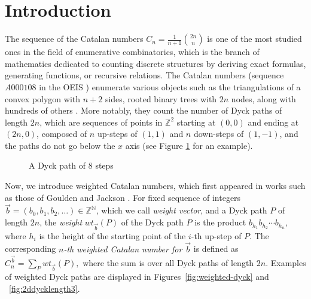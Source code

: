 \documentclass[12pt,notitlepage]{amsart}
\numberwithin{equation}{section}
\theoremstyle{thmstyleone}%
\theoremstyle{thmstyletwo}%
\theoremstyle{thmstylethree}%
\numberwithin{theorem}{section}
\numberwithin{equation}{section}
\begin{document}
\section{Introduction}
\label{section:intro}
The sequence of the Catalan numbers $\displaystyle C_n = \frac{1}{n+1} \binom{2n}{n}$ is one of the most studied ones in the field of enumerative combinatorics, which is the branch of mathematics dedicated to counting discrete structures by deriving exact formulas, generating functions, or recursive relations. The Catalan numbers (sequence $A000108$ in the OEIS \cite{oeis}) enumerate various objects such as the triangulations of a convex polygon with $n+2$ sides, rooted binary trees with $2n$ nodes, along with hundreds of others \cite{StanleyCatalan}. More notably, they count the number of Dyck paths of length $2n$, which are sequences of points in $\mathbb{Z}^2$ starting at $(0,0)$ and ending at $(2n,0)$, composed of $n$ up-steps of $(1,1)$ and $n$ down-steps of $(1, -1)$, and the paths do not go below the $x$ axis (see Figure \ref{fig:dyckpath} for an example).
\begin{figure}[h]
\centering
{}
\vspace{-0.5 em}
\caption{A Dyck path of $8$ steps}
    \label{fig:dyckpath}
\end{figure}

Now, we introduce weighted Catalan numbers, which first appeared in works such as those of Goulden and Jackson \cite{Goulden}. For fixed sequence of integers $\vec{b} = (b_0,b_1,b_2,\ldots) \in \mathbb{Z}^{\mathbb{N}}$, which we call \emph{weight vector}, and a Dyck path $P$ of length $2n$, the \emph{weight} $wt_{\vec{b}}(P)$ of the Dyck path $P$ is the product $b_{h_1} b_{h_2}\cdots b_{h_n}$, where $h_i$ is the height of the starting point of the $i$-th up-step of $P$. The corresponding \emph{$n$-th weighted Catalan number for $\vec{b}$} is defined as $\displaystyle C_n^{\vec{b}} = \sum_P wt_{\vec{b}}(P),$  where the sum is over all Dyck paths of length $2n$. Examples of weighted Dyck paths are displayed in Figures~\ref{fig:weighted-dyck} and ~\ref{fig:2ddycklength3}.
\vspace{-0.5em}
\end{document}
